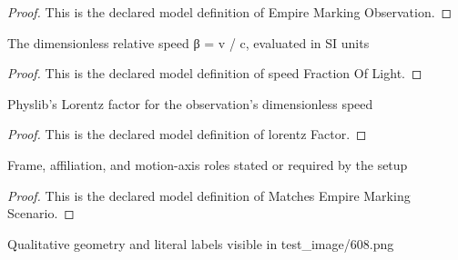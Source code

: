\begin{proof}
  This is the declared model definition of Empire Marking Observation.
\end{proof}
\begin{definition}
  \label{def:physics:phyx-mini-0608:phyxminiproblems-problemphyxmini0608-speedfractionoflight}
  The dimensionless relative speed β = v / c, evaluated in SI units
\end{definition}
\begin{proof}
  This is the declared model definition of speed Fraction Of Light.
\end{proof}
\begin{definition}
  \label{def:physics:phyx-mini-0608:phyxminiproblems-problemphyxmini0608-lorentzfactor}
  Physlib's Lorentz factor for the observation's dimensionless speed
\end{definition}
\begin{proof}
  This is the declared model definition of lorentz Factor.
\end{proof}
\begin{definition}
  \label{def:physics:phyx-mini-0608:phyxminiproblems-problemphyxmini0608-matchesempiremarkingscenario}
  Frame, affiliation, and motion-axis roles stated or required by the setup
\end{definition}
\begin{proof}
  This is the declared model definition of Matches Empire Marking Scenario.
\end{proof}
\begin{definition}
  \label{def:physics:phyx-mini-0608:phyxminiproblems-problemphyxmini0608-matchessuppliedstarshipfigure}
  Qualitative geometry and literal labels visible in test\_image/608.png
\end{definition}
